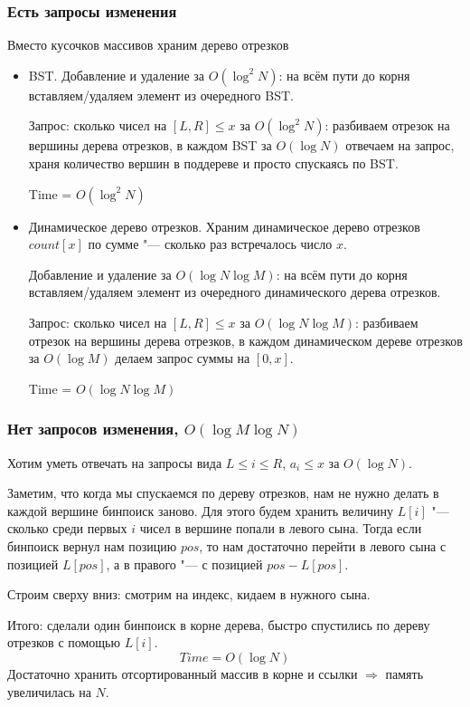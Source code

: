 \subsubsection{Есть запросы изменения}
					
Вместо кусочков массивов храним дерево отрезков
\begin{itemize}
\item
	BST.
	Добавление и удаление за $O(\log^2 N)$: на всём пути до корня вставляем/удаляем элемент из очередного BST.

	Запрос: сколько чисел на $[L, R] \le x$ за $O(\log^2 N)$: разбиваем отрезок на вершины дерева отрезков,
	в каждом BST за $O(\log N)$ отвечаем на запрос, храня количество вершин в поддереве и просто спускаясь по BST.

	Time = $O(\log^2 N)$

\item
	Динамическое дерево отрезков.
	Храним динамическое дерево отрезков $count[x]$ по сумме "--- сколько раз встречалось число $x$.
	
	Добавление и удаление за $O(\log N \log M)$: на всём пути до корня вставляем/удаляем элемент из очередного динамического дерева отрезков.

	Запрос: сколько чисел на $[L, R] \le x$ за $O(\log N \log M)$: разбиваем отрезок на вершины дерева отрезков,
	в каждом динамическом дереве отрезков за $O(\log M)$ делаем запрос суммы на $[0, x]$.

	Time = $O(\log N \log M)$
\end{itemize}
			
\subsubsection{Нет запросов изменения, $O(\log M \log N)$}

Хотим уметь отвечать на запросы вида $L \le i \le R$, $a_i \le x$ за $O(\log N)$.

Заметим, что когда мы спускаемся по дереву отрезков, нам не нужно делать в каждой вершине бинпоиск заново.
Для этого будем хранить величину $L[i]$ "--- сколько среди первых $i$ чисел в вершине попали в левого сына.
Тогда если бинпоиск вернул нам позицию $pos$, то нам достаточно перейти в левого сына с позицией $L[pos]$, а в правого "--- с позицией $pos - L[pos]$.

Строим сверху вниз: смотрим на индекс, кидаем в нужного сына.

Итого: сделали один бинпоиск в корне дерева, быстро спустились по дереву отрезков с помощью $L[i]$.
\[ Time = O(\log N) \]
Достаточно хранить отсортированный массив в корне и ссылки $\Rightarrow$ память увеличилась на $N$.

